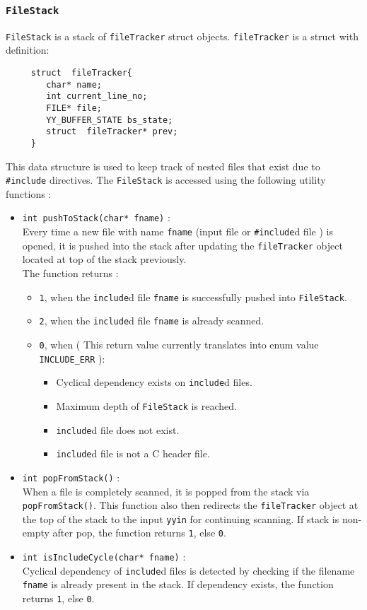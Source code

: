 \documentclass[12pt]{article}
\begin{document}
\subsubsection{\texttt{FileStack}}
\label{FS}
\texttt{FileStack} is a stack of \texttt{fileTracker} struct objects. \texttt{fileTracker} is a struct with definition:
\begin{verbatim}
     struct  fileTracker{
        char* name;
        int current_line_no;
        FILE* file;
        YY_BUFFER_STATE bs_state;
        struct  fileTracker* prev;
     }
\end{verbatim}

This data structure is used to keep track of nested files that exist due to \texttt{\#include} directives. The \texttt{FileStack} is accessed using the following utility functions :
\begin{itemize}
\item  \texttt{int pushToStack(char* fname)} :
\\Every time a new file with name \texttt{fname} (input file or \texttt{\#include}d file ) is opened, it is pushed into the stack after updating the \texttt{fileTracker} object located at top of the stack previously.
\\The function returns  :
\begin{itemize}
\item \texttt{1}, when the \texttt{include}d file \texttt{fname} is successfully pushed into \texttt{FileStack}.
\item \texttt{2}, when the \texttt{include}d file \texttt{fname} is already scanned.
\item \texttt{0}, when ( This return value currently translates into enum value \texttt{INCLUDE\_ERR} ):
\begin{itemize}
\item Cyclical dependency exists on \texttt{include}d files.
\item Maximum depth of \texttt{FileStack} is reached.
\item \texttt{include}d file does not exist.
\item \texttt{include}d file is not a C header file.
\end{itemize}
\end{itemize}
          
	
\item  \texttt{int popFromStack()} :
\\When a file is completely scanned, it is popped from the stack via \texttt{popFromStack()}. 
This function also then redirects the \texttt{fileTracker} object at the top of the stack to the input \texttt{yyin} for continuing scanning. If stack is non-empty after pop, the function returns \texttt{1}, else \texttt{0}.

\item	 \texttt{int isIncludeCycle(char* fname)} :
\\Cyclical dependency of \texttt{include}d files is detected by checking if the filename \texttt{fname} is already present in the stack. If dependency exists, the function returns \texttt{1}, else \texttt{0}.

\end{itemize}
\end{document}
